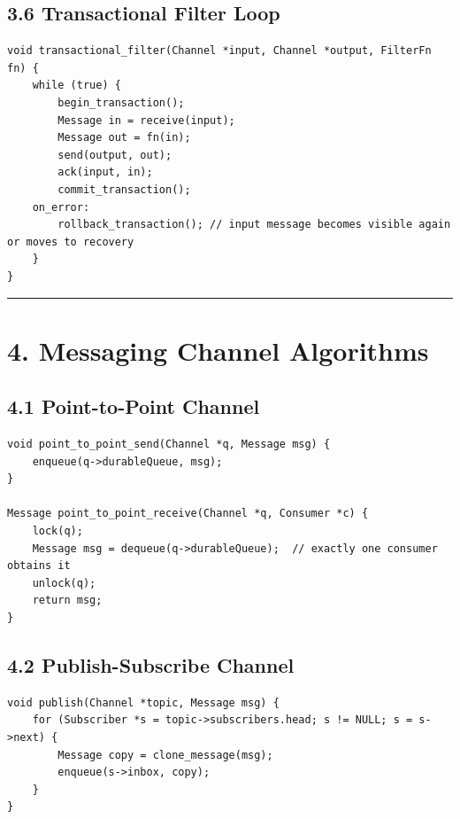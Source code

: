 \documentclass[11pt]{article}
\begin{document}
\subsection{3.6 Transactional Filter
Loop}\label{transactional-filter-loop}

\begin{verbatim}
void transactional_filter(Channel *input, Channel *output, FilterFn fn) {
    while (true) {
        begin_transaction();
        Message in = receive(input);
        Message out = fn(in);
        send(output, out);
        ack(input, in);
        commit_transaction();
    on_error:
        rollback_transaction(); // input message becomes visible again or moves to recovery
    }
}
\end{verbatim}

\begin{center}\rule{0.5\linewidth}{0.5pt}\end{center}

\section{4. Messaging Channel
Algorithms}\label{messaging-channel-algorithms}

\subsection{4.1 Point-to-Point Channel}\label{point-to-point-channel}

\begin{verbatim}
void point_to_point_send(Channel *q, Message msg) {
    enqueue(q->durableQueue, msg);
}

Message point_to_point_receive(Channel *q, Consumer *c) {
    lock(q);
    Message msg = dequeue(q->durableQueue);  // exactly one consumer obtains it
    unlock(q);
    return msg;
}
\end{verbatim}

\subsection{4.2 Publish-Subscribe
Channel}\label{publish-subscribe-channel}

\begin{verbatim}
void publish(Channel *topic, Message msg) {
    for (Subscriber *s = topic->subscribers.head; s != NULL; s = s->next) {
        Message copy = clone_message(msg);
        enqueue(s->inbox, copy);
    }
}
\end{verbatim}
\end{document}
